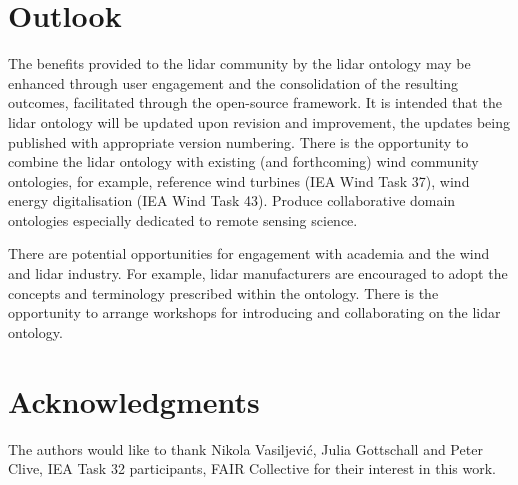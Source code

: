 \documentclass[remotesensing,article,submit,pdftex,moreauthors]{Definitions/mdpi}
\begin{document}


\section{Outlook}
\label{sec:Outlook}
The benefits provided to the lidar community by the lidar ontology may be enhanced through user engagement and the consolidation of the resulting outcomes, facilitated through the open-source framework.
It is intended that the lidar ontology will be updated upon revision and improvement, the updates being published with appropriate version numbering. There is the opportunity to combine the lidar ontology with existing (and forthcoming) wind community ontologies, for example,  
reference wind turbines (IEA Wind Task 37), wind energy digitalisation (IEA Wind Task 43). Produce collaborative domain ontologies especially dedicated to remote sensing science.

There are potential opportunities for engagement with academia and the wind and lidar industry. For example, lidar manufacturers are encouraged to adopt the concepts and terminology prescribed within the ontology.
There is the opportunity to arrange workshops for introducing and collaborating on the lidar ontology.


\section{Acknowledgments}
The authors would like to thank Nikola Vasiljevi\'{c}, Julia Gottschall and Peter Clive, IEA Task 32 participants, FAIR Collective for their interest in this work.

\vspace{6pt} 


\end{document}
